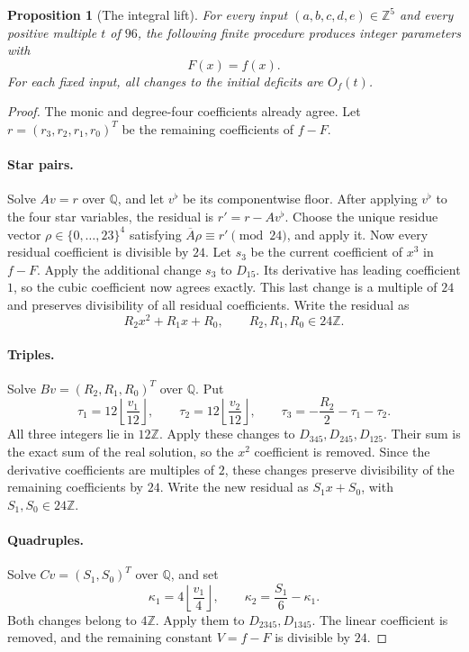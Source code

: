\documentclass[11pt,a4paper]{article}
\newtheorem{proposition}[theorem]{Proposition}
\theoremstyle{definition}
\newcommand{\Z}{\mathbb Z}
\newcommand{\Q}{\mathbb Q}
\begin{document}
\begin{proposition}[The integral lift]\label{prop:lift}
For every input $(a,b,c,d,e)\in\Z^5$ and every positive multiple $t$ of $96$,
the following finite procedure produces integer parameters with
\begin{equation}\label{eq:Fisf}
 F(x)=f(x).
\end{equation}
For each fixed input, all changes to the initial deficits are $O_f(t)$.
\end{proposition}
\begin{proof}
The monic and degree-four coefficients already agree. Let
$r=(r_3,r_2,r_1,r_0)^T$ be the remaining coefficients of $f-F$.

\paragraph{Star pairs.}
Solve $A v=r$ over $\Q$, and let $v^\flat$ be its componentwise floor.
After applying $v^\flat$ to the four star variables, the residual is
$r'=r-A v^\flat$.
Choose the unique residue vector
$\rho\in\{0,\ldots,23\}^4$ satisfying
$\overline A\rho\equiv r'\pmod{24}$, and apply it.
Now every residual coefficient is divisible by $24$.
Let $s_3$ be the current coefficient of $x^3$ in $f-F$.
Apply the additional change $s_3$ to $D_{15}$.
Its derivative has leading coefficient $1$, so the cubic coefficient
now agrees exactly. This last change is a multiple of $24$ and
preserves divisibility of all residual coefficients. Write the residual as
\[
 R_2x^2+R_1x+R_0,\qquad R_2,R_1,R_0\in24\Z.
\]

\paragraph{Triples.}
Solve
$Bv=(R_2,R_1,R_0)^T$ over $\Q$. Put
\[
 \tau_1=12\left\lfloor\frac{v_1}{12}\right\rfloor,\qquad
 \tau_2=12\left\lfloor\frac{v_2}{12}\right\rfloor,\qquad
 \tau_3=-\frac{R_2}{2}-\tau_1-\tau_2.
\]
All three integers lie in $12\Z$.
Apply these changes to $D_{345},D_{245},D_{125}$.
Their sum is the exact sum of the real solution, so the $x^2$
coefficient is removed. Since the derivative coefficients are multiples
of $2$, these changes preserve divisibility of the remaining coefficients
by $24$. Write the new residual as $S_1x+S_0$, with $S_1,S_0\in24\Z$.

\paragraph{Quadruples.}
Solve $Cv=(S_1,S_0)^T$ over $\Q$, and set
\[
 \kappa_1=4\left\lfloor\frac{v_1}{4}\right\rfloor,\qquad
 \kappa_2=\frac{S_1}{6}-\kappa_1.
\]
Both changes belong to $4\Z$. Apply them to $D_{2345},D_{1345}$.
The linear coefficient is removed, and the remaining constant
$V=f-F$ is divisible by $24$.


\end{proof}
\end{document}
